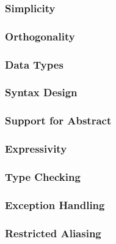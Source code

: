 \documentclass{article}
\begin{document}
  \subsubsection{Simplicity}

  \subsubsection{Orthogonality}

  \subsubsection{Data Types}

  \subsubsection{Syntax Design}

  \subsubsection{Support for Abstract}

  \subsubsection{Expressivity}

  \subsubsection{Type Checking}

  \subsubsection{Exception Handling}

  \subsubsection{Restricted Aliasing}

  \newpage
  \nocite{*} \printbibliography[heading=bibintoc,title={References}]{}
\end{document}
